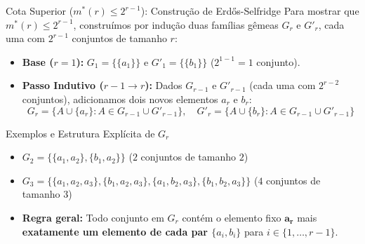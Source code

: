 \documentclass[11pt, aspectratio=169]{beamer}
\begin{document}
\begin{frame}{Cota Superior ($m^*(r) \le 2^{r-1}$): Construção de Erdős-Selfridge}
    Para mostrar que $m^*(r) \le 2^{r-1}$, construímos por indução duas famílias gêmeas $G_r$ e $G'_r$, cada uma com $2^{r-1}$ conjuntos de tamanho $r$:

    \begin{itemize}
        \item \textbf{Base ($r=1$):} $G_1 = \{\{a_1\}\}$ e $G'_1 = \{\{b_1\}\}$ ($2^{1-1} = 1$ conjunto).
        \item \textbf{Passo Indutivo ($r-1 \to r$):} Dados $G_{r-1}$ e $G'_{r-1}$ (cada uma com $2^{r-2}$ conjuntos), adicionamos dois novos elementos $a_r$ e $b_r$:
        $$G_r = \{ A \cup \{a_r\} : A \in G_{r-1} \cup G'_{r-1} \}, \quad G'_r = \{ A \cup \{b_r\} : A \in G_{r-1} \cup G'_{r-1} \}$$
    \end{itemize}

    \begin{exampleblock}{Exemplos e Estrutura Explícita de $G_r$}
        \begin{itemize}
            \item $G_2 = \{\{a_1, a_2\}, \{b_1, a_2\}\}$ \quad ($2$ conjuntos de tamanho $2$)
            \item $G_3 = \{\{a_1, a_2, a_3\}, \{b_1, a_2, a_3\}, \{a_1, b_2, a_3\}, \{b_1, b_2, a_3\}\}$ \quad ($4$ conjuntos de tamanho $3$)
            \item \textbf{Regra geral:} Todo conjunto em $G_r$ contém o elemento fixo $\mathbf{a_r}$ mais \textbf{exatamente um elemento de cada par $\{a_i, b_i\}$} para $i \in \{1, \dots, r-1\}$.
        \end{itemize}
    \end{exampleblock}
\end{frame}
\end{document}
